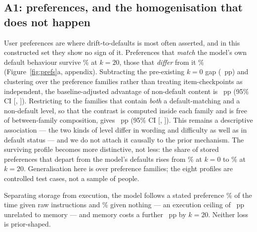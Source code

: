 \subsection{A1: preferences, and the homogenisation that does not happen}
\label{sec:prefs}
User preferences are where drift-to-defaults is most often asserted, and in this constructed set they
show no sign of it. Preferences that \emph{match} the model's own default behaviour survive
\PrefDefaultK{}\% at $k{=}20$, those that \emph{differ} from it \PrefNonDefaultK{}\%
(Figure~\ref{fig:prefs}a, appendix). Subtracting the pre-existing $k{=}0$ gap (\PrefGapZero{}~pp) and
clustering over the \PrefNFamilies{} preference families rather than treating item-checkpoints as
independent, the baseline-adjusted advantage of non-default content is \PrefAdj{}~pp (95\% CI
[\PrefAdjLo{}, \PrefAdjHi{}]). Restricting to the \PrefWithinN{} families that
contain \emph{both} a default-matching and a non-default level, so that the contrast is computed
inside each family and is free of between-family composition, gives \PrefWithin{}~pp (95\% CI
[\PrefWithinLo{}, \PrefWithinHi{}]). This remains a descriptive association --- the two kinds of level
differ in wording and difficulty as well as in default status --- and we do not attach it causally to
the prior mechanism. The surviving profile becomes more
distinctive, not less: the share of stored preferences that depart from the model's defaults rises
from \PrefShareZero{}\% at $k{=}0$ to \PrefShareK{}\% at $k{=}20$. Generalisation here is over
preference families; the eight profiles are controlled test cases, not a sample of people.

Separating storage from execution, the model follows a stated preference
\PrefCondA{}\% of the time given raw instructions and \PrefCondC{}\% given nothing --- an execution
ceiling of \PrefExecLoss{}~pp unrelated to memory --- and memory costs a further
\PrefStorageLoss{}~pp by $k{=}20$. Neither loss is prior-shaped.

